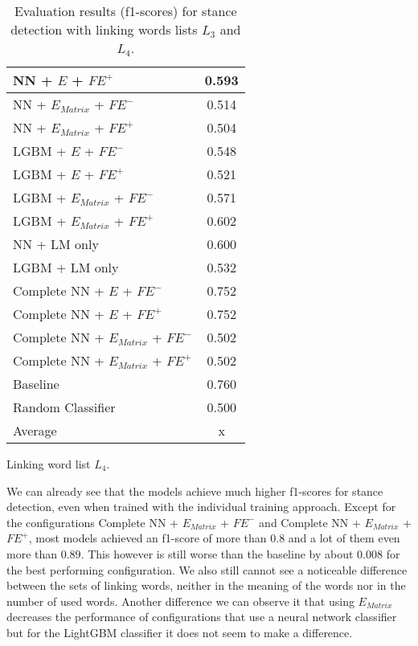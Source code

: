 \begin{table}[h]
\begin{subtable}{.5\textwidth}
\begin{tabular}{|| l || c ||}
 			\hline
 			NN + $E$ + $\textit{FE}^+$ & 0.593 \\
 			\hline
 			NN + $E_{Matrix}$ + $\textit{FE}^-$ & 0.514 \\
 			\hline
 			NN + $E_{Matrix}$ + $\textit{FE}^+$ & 0.504 \\
 			\hline
 			LGBM + $E$ + $\textit{FE}^-$ & 0.548 \\
 			\hline
 			LGBM + $E$ + $\textit{FE}^+$ & 0.521 \\
 			\hline
 			LGBM + $E_{Matrix}$ + $\textit{FE}^-$ & 0.571 \\
 			\hline
 			LGBM + $E_{Matrix}$ + $\textit{FE}^+$ & 0.602 \\
 			\hline
 			NN + LM only & 0.600 \\
 			\hline
 			LGBM + LM only & 0.532 \\
 			\hline
 			Complete NN + $E$ + $\textit{FE}^-$ & 0.752 \\
 			\hline
 			Complete NN + $E$ + $\textit{FE}^+$ & 0.752 \\
 			\hline
 			Complete NN + $E_{Matrix}$ + $\textit{FE}^-$ & 0.502 \\
 			\hline
 			Complete NN + $E_{Matrix}$ + $\textit{FE}^+$ & 0.502 \\
 			\hline
 			Baseline & 0.760 \\
 			\hline
 			Random Classifier & 0.500 \\
 			\hline
 			\hline
 			Average & x \\
 			\hline
		\end{tabular}
		\renewcommand{\arraystretch}{1}
  		\caption{Linking word list $L_4$.}%
  	\end{subtable}
  	\caption{Evaluation results (f1-scores) for stance detection with linking words lists $L_3$ and $L_4$.}%
  	\label{fig:stanceresults2}
\end{table}

We can already see that the models achieve much higher f1-scores for stance detection, even when trained with the individual training approach. Except for the configurations Complete NN + $E_{Matrix}$ + $\textit{FE}^-$ and Complete NN + $E_{Matrix}$ + $\textit{FE}^+$, most models achieved an f1-score of more than $0.8$ and a lot of them even more than $0.89$. This however is still worse than the baseline by about $0.008$ for the best performing configuration. We also still cannot see a noticeable difference between the sets of linking words, neither in the meaning of the words nor in the number of used words. Another difference we can observe it that using $E_{Matrix}$ decreases the performance of configurations that use a neural network classifier but for the LightGBM classifier it does not seem to make a difference.

